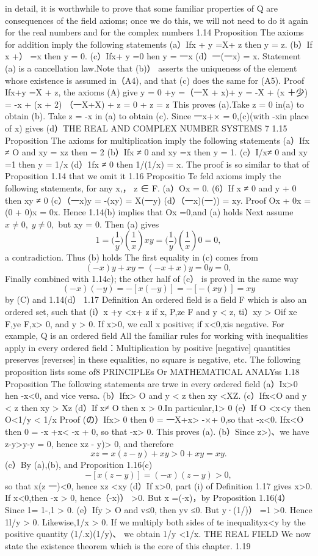 in detail, it is worthwhile to prove that some familiar properties of Q are consequences of the field axioms; once we do this, we will not need to do it again for the real numbers and for the complex numbers 1.14 Proposition The axioms for addition imply the following statements (a）Ifx + y =X+ z then y = z. (b）If x +） =x then y = 0. (c）Ifx+ y =0 hen y = 一x (d）一(一x) = x. Statement (a) is a cancellation law.Note that (b)） asserts the uniqueness of the element whose existence is assumed in（A4), and that (c) does the same for (A5). Proof Ifx+y =X + z, the axioms (A) give y = 0 +y =（一X + x)+ y = -X + (x ＋少) = -x + (x + 2) （一X+X) + z = 0 + z = z This proves (a).Take z = 0 in(a) to obtain (b). Take z = -x in (a) to obtain (c). Since 一x+× = 0,(c)(with -xin place of x) gives (d）THE REAL AND COMPLEX NUMBER SYSTEMS 7 1.15 Proposition The axioms for multiplication imply the following statements (a）Ifx ≠ O and xy = xz then = 2 (b）Ifx ≠ 0 and xy =x then y = 1. (c）I/x≠ 0 and xy =1 then y = 1/x (d）1fx ≠ 0 then 1/(1/x) = x. The proof is so similar to that of Proposition 1.14 that we omit it 1.16 Propositio Te feld axioms imply the following statements, for any x,， z ∈ F. (a）Ox = 0. (6）If x ≠ 0 and y + 0 then xy ≠ 0 (c）（一x)y = -(xy) = X(一y) (d）（一x)(一)) = xy. Proof Ox + 0x = (0 + 0)x = 0x. Hence 1.14(b) implies that Ox =0,and (a) holds Next assume $x\neq0,\;y\neq0,$ but xy = 0. Then (a) gives $$ 1={\bigg(}{\frac{1}{y}}{\bigg)}\left({\frac{1}{x}}\right)x y={\bigg(}{\frac{1}{y}}{\bigg)}\left({\frac{1}{x}}\right)0=0, $$ a contradiction. Thus (b) holds The first equality in (c) comes from $$ (-x)y+x y=(-x+x)y=0y=0, $$ Finally combined with 1.14c); the other half of (c） is proved in the same way $$ (-x)(-y)=-[x(-y)]=-[-(x y)]=x y $$ by (C) and 1.14(d） 1.17 Definition An ordered field is a field F which is also an ordered set, such that (i）x +y <x+ z if x, P,ze F and y < z, ti）xy > Oif xe F,ye F,x> 0, and y > 0. If x>0, we call x positive; if x<0,xis negative. For example, Q is an ordered field All the familiar rules for working with inequalities apply in every ordered field：Multiplication by positive [negative] quantities preserves [reverses] in these equalities, no square is negative, etc. The following proposition lists some of8 PRINCIPLEs Or MATHEMATICAL ANALYss 1.18 Proposition The following statements are trwe in every ordered field (a）Ix>0 hen -x<0, and vice versa. (b）Ifx> O and y < z then xy <XZ. (c）Ifx<O and y < z then xy > Xz (d）If x≠ O then x > 0.In particular,1> 0 (e）If O <x<y then O<1/y < 1/x Proof (の）Ifx> 0 then 0 = 一X+x> -×+ 0,so that -x<0. Ifx<O then 0 = -x +x< -x + 0, so that -x> 0. This proves (a). (b）Since z>)、we have z-y>y-y = 0, hence xz - y)> 0, and therefore $$ x z=x(z-y)+x y>0+x y=x y. $$ (c）By (a),(b), and Proposition 1.16(c) $$ -\left[x(z-y)\right]=(-x)(z-y)>0, $$ so that x(z 一)<0, hence xz <xy (d）If x>0, part (i) of Definition 1.17 gives x>0. If x<0,then -x > 0, hence（-x)） >0. But x =(-x)，by Proposition 1.16(4） Since 1= 1-,1 > 0. (e）Ify > O and v≤0, then yv ≤0. But y·(1/)） =1 >0. Hence 1l/y > 0. Likewise,1/x > 0. If we multiply both sides of te inequalityx<y by the positive quantity (1/.x)(1/y)、 we obtain 1/y <1/x. THE REAL FIELD We now state the existence theorem which is the core of this chapter. 1.19 